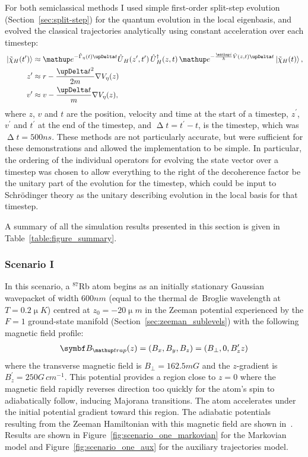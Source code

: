 For both semiclassical methods I used simple first-order split-step evolution (Section~\ref{sec:split-step}) for the quantum evolution in the local eigenbasis, and evolved the classical trajectories analytically using constant acceleration over each timestep:
\begin{align}
\ket{\tilde\chi_H(t^\prime)} &\approx \ee^{-\hat\Gamma_\eta(t)\upDelta t}\hat U_H(z^\prime, t^\prime)\,\hat U_H^\dagger(z, t)\,\ee^{-\frac\ii\hbar \hat V(z, t)\upDelta t}\ket{\tilde\chi_H(t)},\\
z^\prime &\approx r - \frac{\upDelta t^2}{2m}\nabla V_\eta(z)\\
v^\prime &\approx v - \frac{\upDelta t}{m}\nabla V_\eta(z),
\end{align}
where $z$, $v$ and $t$ are the position, velocity and time at the start of a timestep, $z^\prime$, $v^\prime$ and $t^\prime$ at the end of the timestep, and $\upDelta t = t^\prime - t$, is the timestep, which was $\upDelta t = 500\unit{ns}$. These methods are not particularly accurate, but were sufficient for these demonstrations and allowed the implementation to be simple. In particular, the ordering of the individual operators for evolving the state vector over a timestep was chosen to allow everything to the right of the decoherence factor be the unitary part of the evolution for the timestep, which could be input to Schr\"odinger theory as the unitary describing evolution in the local basis for that timestep.

A summary of all the simulation results presented in this section is given in Table~\ref{table:figure_summary}.

\subsubsection{Scenario I}

In this scenario, a $^{87}$Rb atom begins as an initially stationary Gaussian wavepacket of width $600\unit{nm}$ (equal to the thermal de~Broglie wavelength at $T=0.2\unit{\upmu K}$) centred at $z_0 = -20\unit{\upmu m}$ in the Zeeman potential experienced by the $F=1$ ground-state manifold (Section~\ref{sec:zeeman_sublevels}) with the following magnetic field profile:
\begin{align}
\vec B_\up{trap}(z) = (B_x, B_y, B_z) = \left(B_\perp, 0, B_z^\prime z\right)
\end{align}
where the transverse magnetic field is $B_\perp = 162.5\unit{mG}$ and the $z$-gradient is $B_z^\prime = 250\unit{G\,cm^{-1}}$. This potential provides a region close to $z=0$ where the magnetic field rapidly reverses direction too quickly for the atom's spin to adiabatically follow, inducing Majorana transitions. The atom accelerates under the initial potential gradient toward this region. The adiabatic potentials resulting from the Zeeman Hamiltonian with this magnetic field are shown in~. Results are shown in Figure~\ref{fig:scenario_one_markovian} for the Markovian model and Figure~\ref{fig:scenario_one_aux} for the auxiliary trajectories model.

